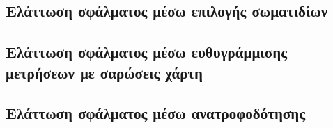 \subsection{Ελάττωση σφάλματος μέσω επιλογής σωματιδίων}
\subsection{Ελάττωση σφάλματος μέσω ευθυγράμμισης μετρήσεων με σαρώσεις χάρτη}
\subsection{Ελάττωση σφάλματος μέσω ανατροφοδότησης}
